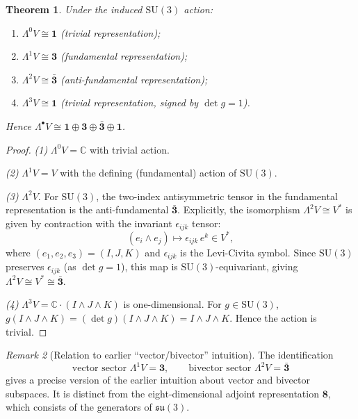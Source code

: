 \documentclass[12pt,a4paper]{article}
\newtheorem{theorem}{Theorem}[section]
\theoremstyle{definition}
\theoremstyle{remark}
\newtheorem{remark}[theorem]{Remark}
\begin{document}
\begin{theorem}\label{thm:fock_reps}
Under the induced $\mathrm{SU}(3)$ action:
\begin{enumerate}
  \item $\Lambda^0 V \cong \mathbf{1}$ (trivial representation);
  \item $\Lambda^1 V \cong \mathbf{3}$ (fundamental representation);
  \item $\Lambda^2 V \cong \bar{\mathbf{3}}$ (anti-fundamental representation);
  \item $\Lambda^3 V \cong \mathbf{1}$ (trivial representation, signed by $\det g = 1$).
\end{enumerate}
Hence $\Lambda^\bullet V \cong \mathbf{1}\oplus\mathbf{3}\oplus\bar{\mathbf{3}}\oplus\mathbf{1}$.
\end{theorem}

\begin{proof}
\emph{(1)} $\Lambda^0 V = \mathbb{C}$ with trivial action.

\emph{(2)} $\Lambda^1 V = V$ with the defining (fundamental) action of $\mathrm{SU}(3)$.

\emph{(3)} $\Lambda^2 V$.
For $\mathrm{SU}(3)$, the two-index antisymmetric tensor in the fundamental
representation is the anti-fundamental $\bar{\mathbf{3}}$.  Explicitly,
the isomorphism $\Lambda^2 V \cong V^*$ is given by contraction with the invariant
$\epsilon_{ijk}$ tensor:
\begin{equation}
  (e_i\wedge e_j) \mapsto \epsilon_{ijk}\,e^k \in V^*,
\end{equation}
where $(e_1,e_2,e_3) = (I,J,K)$ and $\epsilon_{ijk}$ is the Levi-Civita symbol.
Since $\mathrm{SU}(3)$ preserves $\epsilon_{ijk}$ (as $\det g = 1$), this map is
$\mathrm{SU}(3)$-equivariant, giving $\Lambda^2 V \cong V^* \cong \bar{\mathbf{3}}$.

\emph{(4)} $\Lambda^3 V = \mathbb{C}\cdot(I\wedge J\wedge K)$ is one-dimensional.
For $g\in\mathrm{SU}(3)$, $g(I\wedge J\wedge K) = (\det g)(I\wedge J\wedge K) = I\wedge J\wedge K$.
Hence the action is trivial.
\end{proof}

\begin{remark}[Relation to earlier ``vector/bivector'' intuition]
The identification
\begin{equation}
  \text{vector sector } \Lambda^1 V = \mathbf{3}, \qquad
  \text{bivector sector } \Lambda^2 V = \bar{\mathbf{3}}
\end{equation}
gives a precise version of the earlier intuition about vector and bivector
subspaces.  It is distinct from the eight-dimensional adjoint representation
$\mathbf{8}$, which consists of the generators of $\mathfrak{su}(3)$.
\end{remark}
\end{document}
